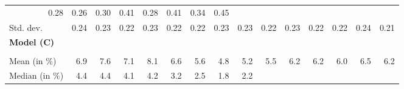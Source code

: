 \begin{tabular}{lllllllllllllll}
  \multicolumn{1}{r}{0.28} &
  \multicolumn{1}{r}{0.26} &
  \multicolumn{1}{r}{0.30} &
  \multicolumn{1}{r}{0.41} &
  \multicolumn{1}{r}{0.28} &
  \multicolumn{1}{r}{0.41} &
  \multicolumn{1}{r}{0.34} &
  \multicolumn{1}{r}{0.45} \\
\multicolumn{1}{l}{\hspace{2em}Std. dev.} &
  \multicolumn{1}{|r}{0.24} &
  \multicolumn{1}{r}{0.23} &
  \multicolumn{1}{r}{0.22} &
  \multicolumn{1}{r}{0.23} &
  \multicolumn{1}{r}{0.22} &
  \multicolumn{1}{r}{0.22} &
  \multicolumn{1}{r}{0.23} &
  \multicolumn{1}{r}{0.23} &
  \multicolumn{1}{r}{0.22} &
  \multicolumn{1}{r}{0.23} &
  \multicolumn{1}{r}{0.22} &
  \multicolumn{1}{r}{0.22} &
  \multicolumn{1}{r}{0.24} &
  \multicolumn{1}{r}{0.21} \\
\multicolumn{1}{l}{{\textbf{Model (C)}}} &
  \multicolumn{1}{|r}{} &
  \multicolumn{1}{r}{} &
  \multicolumn{1}{r}{} &
  \multicolumn{1}{r}{} &
  \multicolumn{1}{r}{} &
  \multicolumn{1}{r}{} &
  \multicolumn{1}{r}{} &
  \multicolumn{1}{r}{} &
  \multicolumn{1}{r}{} &
  \multicolumn{1}{r}{} &
  \multicolumn{1}{r}{} &
  \multicolumn{1}{r}{} &
  \multicolumn{1}{r}{} &
  \multicolumn{1}{r}{} \\
\multicolumn{1}{l}{\hspace{1em}{\textit{Additive term} ($\widehat{t}^{add}/\widetilde{p}$)}} &
  \multicolumn{1}{|r}{} &
  \multicolumn{1}{r}{} &
  \multicolumn{1}{r}{} &
  \multicolumn{1}{r}{} &
  \multicolumn{1}{r}{} &
  \multicolumn{1}{r}{} &
  \multicolumn{1}{r}{} &
  \multicolumn{1}{r}{} &
  \multicolumn{1}{r}{} &
  \multicolumn{1}{r}{} &
  \multicolumn{1}{r}{} &
  \multicolumn{1}{r}{} &
  \multicolumn{1}{r}{} &
  \multicolumn{1}{r}{} \\
\multicolumn{1}{l}{\hspace{2em}Mean (in $\%$)} &
  \multicolumn{1}{|r}{6.9} &
  \multicolumn{1}{r}{7.6} &
  \multicolumn{1}{r}{7.1} &
  \multicolumn{1}{r}{8.1} &
  \multicolumn{1}{r}{6.6} &
  \multicolumn{1}{r}{5.6} &
  \multicolumn{1}{r}{4.8} &
  \multicolumn{1}{r}{5.2} &
  \multicolumn{1}{r}{5.5} &
  \multicolumn{1}{r}{6.2} &
  \multicolumn{1}{r}{6.2} &
  \multicolumn{1}{r}{6.0} &
  \multicolumn{1}{r}{6.5} &
  \multicolumn{1}{r}{6.2} \\
\multicolumn{1}{l}{\hspace{2em}Median (in $\%$)} &
  \multicolumn{1}{|r}{4.4} &
  \multicolumn{1}{r}{4.4} &
  \multicolumn{1}{r}{4.1} &
  \multicolumn{1}{r}{4.2} &
  \multicolumn{1}{r}{3.2} &
  \multicolumn{1}{r}{2.5} &
  \multicolumn{1}{r}{1.8} &
  \multicolumn{1}{r}{2.2} &

\end{tabular}
